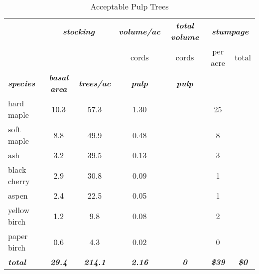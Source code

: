 \documentclass[landscape]{article}
\begin{document}
\begin{table}[H]

\caption{\label{tab:unnamed-chunk-14}Acceptable Pulp Trees}
\fontsize{10}{12}\selectfont
\begin{tabular}[t]{lcccccc}
\toprule
\multicolumn{1}{c}{\em{\textbf{ }}} & \multicolumn{2}{c}{\em{\textbf{stocking}}} & \multicolumn{1}{c}{\em{\textbf{volume/ac }}} & \multicolumn{1}{c}{\em{\textbf{total volume}}} & \multicolumn{2}{c}{\em{\textbf{stumpage}}} \\
\cmidrule(l{3pt}r{3pt}){2-3} \cmidrule(l{3pt}r{3pt}){4-4} \cmidrule(l{3pt}r{3pt}){5-5} \cmidrule(l{3pt}r{3pt}){6-7}
\multicolumn{3}{c}{ } & \multicolumn{1}{c}{cords} & \multicolumn{1}{c}{cords} & \multicolumn{1}{c}{per acre} & \multicolumn{1}{c}{total} \\
\cmidrule(l{3pt}r{3pt}){4-4} \cmidrule(l{3pt}r{3pt}){5-5} \cmidrule(l{3pt}r{3pt}){6-6} \cmidrule(l{3pt}r{3pt}){7-7}
\rowcolor[HTML]{DCDCDC}  \em{\textbf{species}} & \em{\textbf{basal area}} & \em{\textbf{trees/ac}} & \em{\textbf{pulp}} & \em{\textbf{pulp}} & \em{\textbf{ }} & \em{\textbf{ }}\\
\midrule
\rowcolor{gray!6}  hard maple & 10.3 & 57.3 & 1.30 &  & 25 & \\
 
soft maple & 8.8 & 49.9 & 0.48 &  & 8 & \\
 
\rowcolor{gray!6}  ash & 3.2 & 39.5 & 0.13 &  & 3 & \\
 
black cherry & 2.9 & 30.8 & 0.09 &  & 1 & \\
 
\rowcolor{gray!6}  aspen & 2.4 & 22.5 & 0.05 &  & 1 & \\
 
yellow birch & 1.2 & 9.8 & 0.08 &  & 2 & \\
 
\rowcolor{gray!6}  paper birch & 0.6 & 4.3 & 0.02 &  & 0 & \\
 
\rowcolor[HTML]{DCDCDC}  \em{\textbf{total}} & \em{\textbf{29.4}} & \em{\textbf{214.1}} & \em{\textbf{2.16}} & \em{\textbf{0}} & \em{\textbf{\$39}} & \em{\textbf{\$0}}\\
\bottomrule
\end{tabular}
\end{table}
\end{document}
